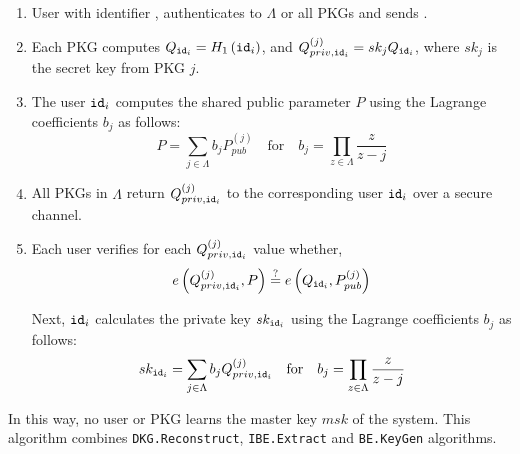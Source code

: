 \begin{algorithm}[H]
\begin{description}
    \begin{enumerate}
        \item User with identifier , authenticates to $\Lambda$ or all PKGs and sends .
        \item Each PKG computes $Q_{\mathtt{id}_{i}} = H_1 \left( \mathtt{id}_{i} \right)$, and $Q_{priv,\mathtt{id}_{i}}^{(j)} = sk_j Q_{\mathtt{id}_{i}}$, where $sk_j$ is the secret key from PKG $j$.
        \item The user $\mathtt{id}_{i}$ computes the shared public parameter $P$ using the Lagrange coefficients $b_j$ as follows:
        \begin{equation*}
         P = \sum_{j \in \Lambda} b_j P_{pub}^{\left( j \right)} \quad \textrm{for} \quad b_j = \prod_{z \in \Lambda} \frac{z}{z-j}
        \end{equation*}
        \item All PKGs in $\Lambda$ return $Q_{priv,\mathtt{id}_{i}}^{(j)}$ to the corresponding user $\mathtt{id}_{i}$ over a secure channel.
        \item Each user verifies for each $Q_{priv,\mathtt{id}_{i}}^{(j)}$ value whether, 
        \begin{equation*}
            e \left( Q_{priv , \mathtt{id}_{i} }^{(j)}, P \right ) \stackrel{?}{=} e \left( Q_{\mathtt{id}_{i}}, P_{pub}^{(j)} \right)
        \end{equation*}
        
        Next, $\mathtt{id}_{i}$ calculates the private key $sk_{\mathtt{id}_{i}}$ using the Lagrange coefficients $b_j$ as follows: 
        \begin{equation*}
            sk_{\mathtt{id}_{i}} = \sum\limits_{j\in\Lambda} b_j Q_{priv,\mathtt{id}_{i}}^{(j)} \quad \textrm{for} \quad b_j = \prod_{z\in \Lambda} \frac{z}{z-j}
        \end{equation*}
        \end{enumerate}
        In this way, no user or PKG learns the master key $msk$ of the system. This algorithm combines \texttt{DKG.Reconstruct}, \texttt{IBE.Extract} and \texttt{BE.KeyGen} algorithms.

    \bigskip
    \bigskip
    \bigskip
    \bigskip
    \bigskip
    \bigskip
    \bigskip 
    \bigskip
    \bigskip
    \bigskip
    \bigskip
    \bigskip
    \bigskip
    \bigskip
    \bigskip 
    \bigskip
    \bigskip
    \bigskip
    \bigskip 
\end{description}
\end{algorithm}

